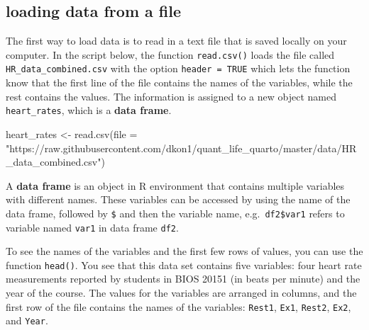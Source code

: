 \documentclass[
  letterpaper,
  DIV=11,
  numbers=noendperiod]{scrreprt}
\newenvironment{Shaded}{\begin{snugshade}}{\end{snugshade}}
\newcommand{\NormalTok}[1]{\textcolor[rgb]{0.00,0.23,0.31}{#1}}
\begin{document}
\hypertarget{loading-data-from-a-file}{%
\subsection*{loading data from a file}\label{loading-data-from-a-file}}

The first way to load data is to read in a text file that is saved
locally on your computer. In the script below, the function
\texttt{read.csv()} loads the file called
\texttt{HR\_data\_combined.csv} with the option \texttt{header\ =\ TRUE}
which lets the function know that the first line of the file contains
the names of the variables, while the rest contains the values. The
information is assigned to a new object named \texttt{heart\_rates},
which is a \textbf{data frame}.

\begin{Shaded}
\begin{Highlighting}[]
\NormalTok{heart\_rates \textless{}{-} read.csv(file = "https://raw.githubusercontent.com/dkon1/quant\_life\_quarto/master/data/HR\_data\_combined.csv")}
\end{Highlighting}
\end{Shaded}

\begin{tcolorbox}[enhanced jigsaw, arc=.35mm, colframe=quarto-callout-tip-color-frame, left=2mm, opacitybacktitle=0.6, breakable, title=\textcolor{quarto-callout-tip-color}{\faLightbulb}\hspace{0.5em}{data frame}, toprule=.15mm, coltitle=black, bottomtitle=1mm, toptitle=1mm, colback=white, leftrule=.75mm, colbacktitle=quarto-callout-tip-color!10!white, titlerule=0mm, opacityback=0, rightrule=.15mm, bottomrule=.15mm]

A \textbf{data frame} is an object in R environment that contains
multiple variables with different names. These variables can be accessed
by using the name of the data frame, followed by \texttt{\$} and then
the variable name, e.g.~\texttt{df2\$var1} refers to variable named
\texttt{var1} in data frame \texttt{df2}.

\end{tcolorbox}

To see the names of the variables and the first few rows of values, you
can use the function \texttt{head()}. You see that this data set
contains five variables: four heart rate measurements reported by
students in BIOS 20151 (in beats per minute) and the year of the course.
The values for the variables are arranged in columns, and the first row
of the file contains the names of the variables: \texttt{Rest1},
\texttt{Ex1}, \texttt{Rest2}, \texttt{Ex2}, and \texttt{Year}.
\end{document}
